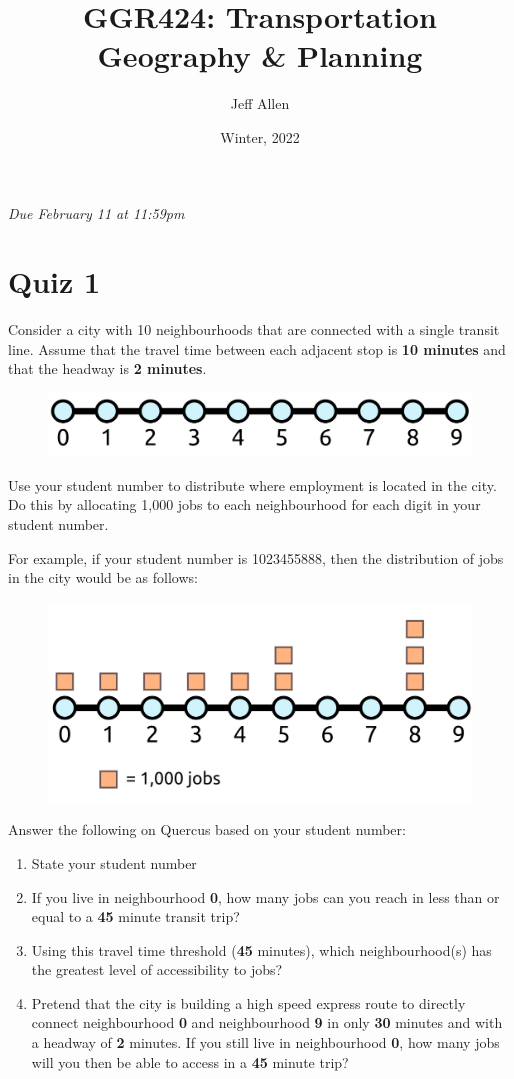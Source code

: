 \documentclass[11pt]{article}
\title{\textbf{GGR424: Transportation Geography \& Planning}}
\author{Jeff Allen}
\date{Winter, 2022}
\begin{document}
	\allsectionsfont{\sffamily}
		
	\textit{Due February 11 at 11:59pm}
		
	\section*{Quiz 1}
	
	Consider a city with 10 neighbourhoods that are connected with a single transit line. Assume that the travel time between each adjacent stop is \textbf{10 minutes} and that the headway is \textbf{2 minutes}.
	
	\begin{figure}[h]
		\centering
		\includegraphics[width=0.5\linewidth]{images/city_plain.png}
	\end{figure}

	Use your student number to distribute where employment is located in the city. Do this by allocating 1,000 jobs to each neighbourhood for each digit in your student number.
	
	For example, if your student number is 1023455888, then the distribution of jobs in the city would be as follows:
	
	\begin{figure}[h]
		\centering
		\includegraphics[width=0.5\linewidth]{images/city_jobs.png}
	\end{figure}
	
	Answer the following on Quercus based on your student number:
	
	\begin{enumerate}
		
		\item State your student number
		
		\item If you live in neighbourhood \textbf{0}, how many jobs can you reach in less than or equal to a \textbf{45} minute transit trip?
		
		\item Using this travel time threshold (\textbf{45} minutes), which neighbourhood(s) has the greatest level of accessibility to jobs?
		
		\item Pretend that the city is building a high speed express route to directly connect neighbourhood \textbf{0} and neighbourhood \textbf{9} in only \textbf{30} minutes and with a headway of \textbf{2} minutes. If you still live in neighbourhood \textbf{0}, how many jobs will you then be able to access in a \textbf{45} minute trip?
		
	\end{enumerate}
	
	
	
	
\end{document}

